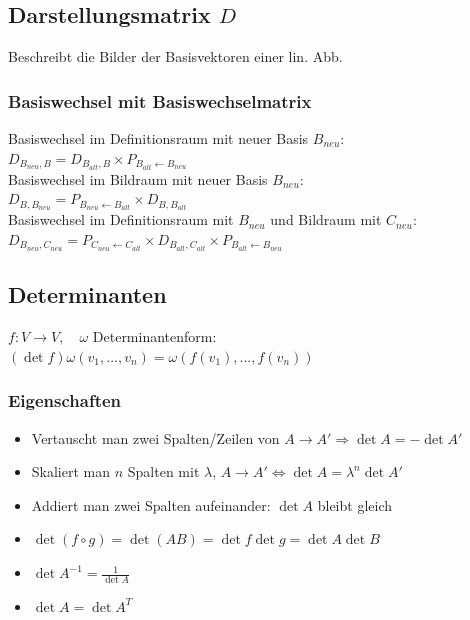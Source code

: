 \documentclass[german, fourcolumn, 8pt]{latex4ei/latex4ei_sheet}
\newcommand{\equival}[0]{\ensuremath{\Longleftrightarrow}}
\begin{document}
\begin{sectionbox}
    \subsection{Darstellungsmatrix $D$}
    Beschreibt die Bilder der Basisvektoren einer lin. Abb.\\

    \subsubsection{Basiswechsel mit Basiswechselmatrix}
    Basiswechsel im Definitionsraum mit neuer Basis $B_{neu}$:\\
    $D_{B_{neu}, B}=D_{B_{alt},B} \times P_{B_{alt} \leftarrow B_{neu}}$\\

    Basiswechsel im Bildraum mit neuer Basis $B_{neu}$:\\
    $D_{B, B_{neu}}=P_{B_{neu} \leftarrow B_{alt}} \times D_{B, B_{alt}}$\\

    Basiswechsel im Definitionsraum mit $B_{neu}$ und Bildraum mit $C_{neu}$:\\
    $D_{B_{neu}, C_{neu}}=P_{C_{neu} \leftarrow C_{alt}} \times D_{B_{alt},C_{alt}} \times P_{B_{alt} \leftarrow B_{neu}}$\\
\end{sectionbox}

\subsection{Determinanten}
\begin{sectionbox}
    $f:V \rightarrow V,\quad \omega$ Determinantenform: \\
    $(\det f)\omega(v_1,...,v_n)=\omega(f(v_1), ..., f(v_n))$
    \subsubsection{Eigenschaften}
    \begin{itemize}
        \item Vertauscht man zwei Spalten/Zeilen von $A \rightarrow A' \Longrightarrow \det A = -\det A'$
        \item Skaliert man $n$ Spalten mit $\lambda$, $A \rightarrow A' \equival \det A = \lambda^n \det A'$
        \item Addiert man zwei Spalten aufeinander: $\det A$ bleibt gleich
        \item $\det(f \circ g)=\det (AB)=\det f \det g = \det A \det B$
        \item $\det A^{-1}=\frac{1}{\det A}$
        \item $\det A = \det A^T$
    \end{itemize}
\end{sectionbox}
\end{document}
